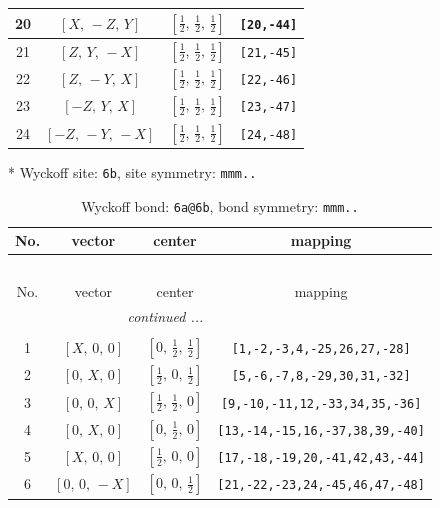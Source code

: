 \documentclass[fleqn,8pt]{jsarticle}
\begin{document}
\begin{longtable}{cccc}
20 & $\left[ X,\, - Z,\, Y \right]$ & $\left[ \frac{1}{2},\, \frac{1}{2},\, \frac{1}{2} \right]$ & {\tt [20,-44]} \\ \hline
21 & $\left[ Z,\, Y,\, - X \right]$ & $\left[ \frac{1}{2},\, \frac{1}{2},\, \frac{1}{2} \right]$ & {\tt [21,-45]} \\ \hline
22 & $\left[ Z,\, - Y,\, X \right]$ & $\left[ \frac{1}{2},\, \frac{1}{2},\, \frac{1}{2} \right]$ & {\tt [22,-46]} \\ \hline
23 & $\left[ - Z,\, Y,\, X \right]$ & $\left[ \frac{1}{2},\, \frac{1}{2},\, \frac{1}{2} \right]$ & {\tt [23,-47]} \\ \hline
24 & $\left[ - Z,\, - Y,\, - X \right]$ & $\left[ \frac{1}{2},\, \frac{1}{2},\, \frac{1}{2} \right]$ & {\tt [24,-48]} \\
\end{longtable}
* Wyckoff site: {\tt 6b}, site symmetry: {\tt mmm..}
\renewcommand{\arraystretch}{1.2}
\begin{longtable}{cccc}
\caption{Wyckoff bond: {\tt 6a@6b}, bond symmetry: {\tt mmm..}}
 \\
 \hline \hline
No. & vector & center & mapping \\ \hline \endfirsthead

\multicolumn{3}{l}{\tablename\ \thetable{}} \\
 \hline \hline
No. & vector & center & mapping \\ \hline \endhead

 \hline \hline
\multicolumn{3}{r}{\footnotesize\it continued ...} \\ \endfoot

 \hline \hline
\multicolumn{3}{r}{} \\ \endlastfoot

1 & $\left[ X,\, 0,\, 0 \right]$ & $\left[ 0,\, \frac{1}{2},\, \frac{1}{2} \right]$ & {\tt [1,-2,-3,4,-25,26,27,-28]} \\ \hline
2 & $\left[ 0,\, X,\, 0 \right]$ & $\left[ \frac{1}{2},\, 0,\, \frac{1}{2} \right]$ & {\tt [5,-6,-7,8,-29,30,31,-32]} \\ \hline
3 & $\left[ 0,\, 0,\, X \right]$ & $\left[ \frac{1}{2},\, \frac{1}{2},\, 0 \right]$ & {\tt [9,-10,-11,12,-33,34,35,-36]} \\ \hline
4 & $\left[ 0,\, X,\, 0 \right]$ & $\left[ 0,\, \frac{1}{2},\, 0 \right]$ & {\tt [13,-14,-15,16,-37,38,39,-40]} \\ \hline
5 & $\left[ X,\, 0,\, 0 \right]$ & $\left[ \frac{1}{2},\, 0,\, 0 \right]$ & {\tt [17,-18,-19,20,-41,42,43,-44]} \\ \hline
6 & $\left[ 0,\, 0,\, - X \right]$ & $\left[ 0,\, 0,\, \frac{1}{2} \right]$ & {\tt [21,-22,-23,24,-45,46,47,-48]} \\
\end{longtable}
\end{document}
